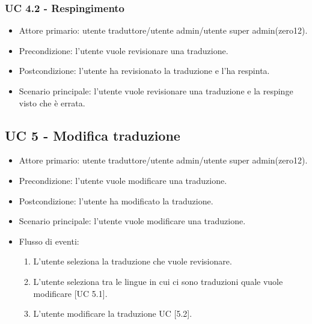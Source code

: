     \subsubsection{UC 4.2 - Respingimento}
        \begin{itemize}
            \item Attore primario: utente traduttore/utente admin/utente super admin(zero12).
            \item Precondizione: l'utente vuole revisionare una traduzione.
            \item Postcondizione: l'utente ha revisionato la traduzione e l'ha respinta.
            \item Scenario principale: l'utente vuole revisionare una traduzione e la respinge visto che è errata.
        \end{itemize}
\subsection{UC 5 - Modifica traduzione}
    \begin{itemize}
        \item Attore primario: utente traduttore/utente admin/utente super admin(zero12).
        \item Precondizione: l'utente vuole modificare una traduzione.
        \item Postcondizione: l'utente ha modificato la traduzione.
        \item Scenario principale: l'utente vuole modificare una traduzione.
        \item Flusso di eventi:
            \begin{enumerate}
                \item L'utente seleziona la traduzione che vuole revisionare.
                \item L'utente seleziona tra le lingue in cui ci sono traduzioni quale vuole modificare [UC 5.1].
                \item L'utente modificare la traduzione UC [5.2].
            \end{enumerate}
    \end{itemize}
